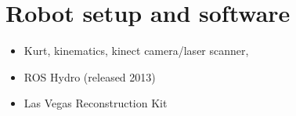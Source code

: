 \documentclass[Thesis.tex]{subfiles}
\begin{document}
\chapter{Robot setup and software}
\begin{itemize}
	\item Kurt, kinematics, kinect camera/laser scanner,
  \item ROS Hydro (released 2013)
  \item Las Vegas Reconstruction Kit
\end{itemize}
\end{document}
